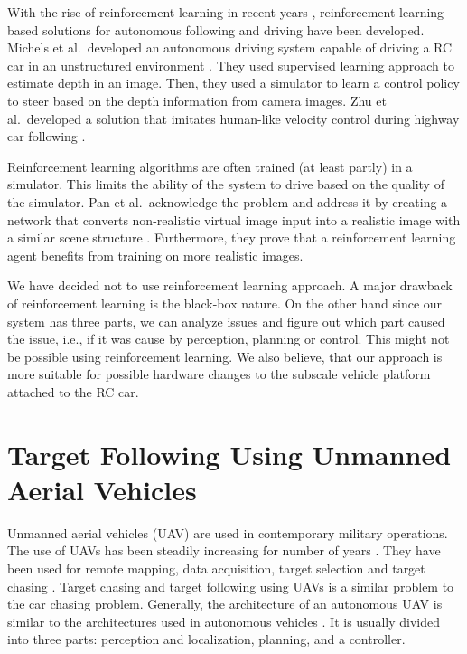 \documentclass{ctuthesis/ctuthesis}
\begin{document}
With the rise of reinforcement learning in recent years \cite{alphago,deepstack,alphastar}, reinforcement learning based solutions for autonomous following and driving have been developed. Michels et al.\ developed an autonomous driving system capable of driving a RC car in an unstructured environment \cite{RL_autonomous_driving}. They used supervised learning approach to estimate depth in an image. Then, they used a simulator to learn a control policy to steer based on the depth information from camera images. Zhu et al.\ developed a solution that imitates human-like velocity control during highway car following \cite{RL_humanlike,RL_velocity}.\par


Reinforcement learning algorithms are often trained (at least partly) in a simulator. This limits the ability of the system to drive based on the quality of the simulator. Pan et al.\ acknowledge the problem and address it by creating a network that converts non-realistic virtual image input into a realistic image with a similar scene structure \cite{synthetic_images}. Furthermore, they prove that a reinforcement learning agent benefits from training on more realistic images.\par


We have decided not to use reinforcement learning approach. A major drawback of reinforcement learning is the black-box nature. On the other hand since our system has three parts, we can analyze issues and figure out which part caused the issue, i.e., if it was cause by perception, planning or control. This might not be possible using reinforcement learning. We also believe, that our approach is more suitable for possible hardware changes to the subscale vehicle platform attached to the RC car. 





\section{Target Following Using Unmanned Aerial Vehicles}
Unmanned aerial vehicles (UAV) are used in contemporary military operations. The use of UAVs has been steadily increasing for number of years \cite{UAV_good_or_bad}. They have been used for remote mapping, data acquisition, target selection and target chasing \cite{UAV_good_or_bad,UAV_use}. Target chasing and target following using UAVs is a similar problem to the car chasing problem. Generally, the architecture of an autonomous UAV is similar to the architectures used in autonomous vehicles \cite{target_following_alg,uva_tracking_formula}. It is usually divided into three parts: perception and localization, planning, and a controller. \par
\end{document}
